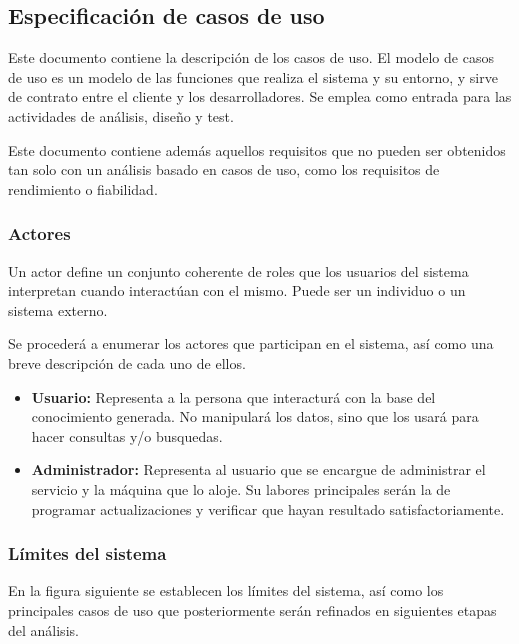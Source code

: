 
\subsection{Especificación de casos de uso}\label{sec:espec-casos-uso}

Este documento contiene la descripción de los casos de uso. El modelo 
de casos de uso es un modelo de las funciones que realiza el sistema y 
su entorno, y sirve de contrato entre el cliente y los desarrolladores. 
Se emplea como entrada para las actividades de análisis, diseño y test.

Este documento contiene además aquellos requisitos que no pueden ser 
obtenidos tan solo con un análisis basado en casos de uso, como los 
requisitos de rendimiento o fiabilidad.

\subsubsection{Actores}

Un actor define un conjunto coherente de roles que los usuarios del 
sistema interpretan cuando interactúan con el mismo. Puede ser un 
individuo o un sistema externo.

Se procederá a enumerar los actores que participan en el sistema, 
así como una breve descripción de cada uno de ellos.

\begin{itemize}
  \item \textbf{Usuario:} Representa a la persona que interacturá con 
	la base del conocimiento generada. No manipulará los datos, 
	sino que los usará para hacer consultas y/o busquedas.
  \item \textbf{Administrador:} Representa al usuario que se encargue 
	de administrar el servicio y la máquina que lo aloje. Su labores 
	principales serán la de programar actualizaciones y verificar 
	que hayan resultado satisfactoriamente.
\end{itemize}

\subsubsection{Límites del sistema}

En la figura siguiente se establecen los límites del sistema, así 
como los principales casos de uso que posteriormente serán refinados 
en siguientes etapas del análisis.

